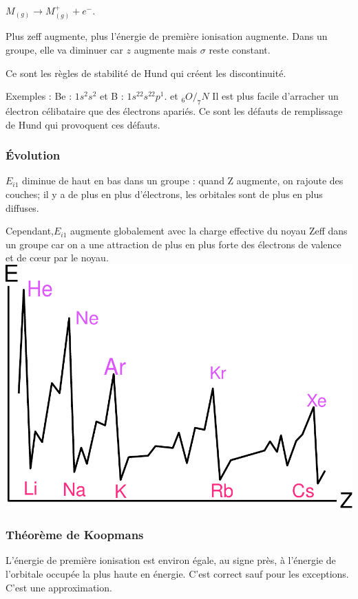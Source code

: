 \documentclass[french]{yLectureNote}
\begin{document}
$M_{(g)} \to M^+_{(g)} + e^-$.


Plus zeff augmente, plus l'énergie de première ionisation augmente. Dans un groupe, elle va diminuer car $z$ augmente mais $\sigma$ reste constant.

Ce sont les règles de stabilité de Hund qui créent les discontinuité.

Exemples : Be : $1s^2s^2$ et B : $1s^22s^22p^1$. et $_6O/_7N$ Il est plus facile d'arracher un électron célibataire que des électrons apariés. Ce sont les défauts de remplissage de Hund qui provoquent ces défauts.
\subsubsection{Évolution}

\begin{multicols}{2}
$E_{i1}$ diminue de haut en bas dans un groupe : quand
Z augmente, on rajoute des couches; il y a de plus
en plus d’électrons, les orbitales sont de plus en
plus diffuses.

Cependant,$E_{i1}$ augmente globalement avec la charge
effective du noyau Zeff dans un groupe car on a une
attraction de plus en plus forte des électrons de
valence et de cœur par le noyau.
\columnbreak
\includegraphics[scale=0.3]{ionisation}
\end{multicols}
\subsubsection{Théorème de Koopmans}
L’énergie de première ionisation est environ égale, au signe près, à l’énergie de l’orbitale occupée la plus haute en énergie. C'est correct sauf pour les exceptions. C'est une approximation.
\end{document}
